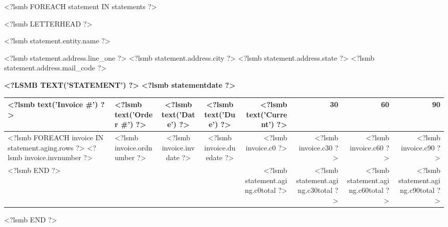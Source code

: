 \documentclass{scrartcl}
\begin{document}
<?lsmb FOREACH statement IN statements ?>
\pagestyle{myheadings}
\thispagestyle{empty}

<?lsmb LETTERHEAD ?>

\parbox[t]{.5\textwidth}{
<?lsmb statement.entity.name ?>

<?lsmb statement.address.line_one ?>
<?lsmb statement.address.city ?> <?lsmb statement.address.state ?>
<?lsmb statement.address.mail_code ?>
}
\hfill

\vspace{1cm}

\textbf{\MakeUppercase{<?lsmb text('Statement') ?>}} \hfill
\textbf{<?lsmb statementdate ?>}

\vspace{2cm}

\begin{tabular*}{\textwidth}{|ll@{\extracolsep\fill}ccrrrr|}
  \hline
  \textbf{<?lsmb text('Invoice #') ?>} & \textbf{<?lsmb text('Order #') ?>}
  & \textbf{<?lsmb text('Date') ?>} & \textbf{<?lsmb text('Due') ?>} &
  \textbf{<?lsmb text('Current') ?>} & \textbf{30} & \textbf{60} & \textbf{90} \\
  \hline
<?lsmb FOREACH invoice IN statement.aging.rows ?>
  <?lsmb invoice.invnumber ?> &
  <?lsmb invoice.ordnumber ?> &
  <?lsmb invoice.invdate ?> &
  <?lsmb invoice.duedate ?> &
  <?lsmb invoice.c0 ?> &
  <?lsmb invoice.c30 ?> &
  <?lsmb invoice.c60 ?> &
  <?lsmb invoice.c90 ?> \\
<?lsmb END ?>
\hline
 & & & &
 <?lsmb statement.aging.c0total ?> &
 <?lsmb statement.aging.c30total ?> &
 <?lsmb statement.aging.c60total ?> &
 <?lsmb statement.aging.c90total ?> \\
\hline
\end{tabular*}

\vspace{0.5cm}

\hfill
\pagebreak
<?lsmb END ?>
\end{document}

